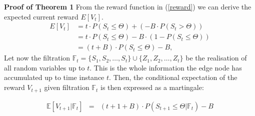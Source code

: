 \documentclass{mpaper}
\begin{document}
\textbf{Proof of Theorem 1}
From the reward function in (\ref{reward}) we can derive the expected current reward $E[V_t]$. 
\begin{equation}
\begin{split}
    E[V_t] & = t \cdot P(S_t \leq \Theta) + (-B \cdot P(S_t > \Theta))\\
    & = t \cdot P(S_t \leq \Theta) - B \cdot (1 - P(S_t \leq \Theta))\\
    & = (t + B) \cdot P(S_t \leq \Theta) - B,
\end{split}
\end{equation}
Let now the filtration $\mathbb{F}_{t} = \{S_{1}, S_{2}, \ldots, S_{t}\} \cup \{Z_{1}, Z_{2}, \ldots, Z_{t}\}$ be the realisation of all random variables up to $t$. This is the whole information the edge node has accumulated up to time instance $t$. 
Then, the conditional expectation of the reward $V_{t+1}$ given filtration $\mathbb{F}_{t}$ is then expressed as a martingale:

\begin{eqnarray}
    \mathbb{E}[V_{t+1}|\mathbb{F}_{t}] & = & (t + 1 + B) \cdot P(S_{t+1} \leq \Theta | \mathbb{F}_t) - B
\end{eqnarray}

\end{document}
